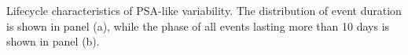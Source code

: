 \label{fig:lifecycle}
Lifecycle characteristics of PSA-like variability. The distribution of event duration is shown in panel (a), while the phase of all events lasting more than 10 days is shown in panel (b).  